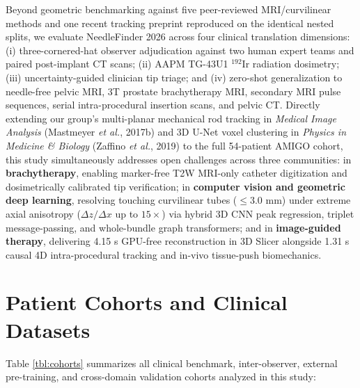 \documentclass[
  11pt,
]{article}
\begin{document}
Beyond geometric benchmarking against five peer-reviewed MRI/curvilinear
methods and one recent tracking preprint reproduced on the identical
nested splits, we evaluate NeedleFinder 2026 across four clinical
translation dimensions: (i) three-cornered-hat observer adjudication
against two human expert teams and paired post-implant CT scans; (ii)
AAPM TG-43U1 \(^{192}\text{Ir}\) radiation dosimetry; (iii)
uncertainty-guided clinician tip triage; and (iv) zero-shot
generalization to needle-free pelvic MRI, 3T prostate brachytherapy MRI,
secondary MRI pulse sequences, serial intra-procedural insertion scans,
and pelvic CT. Directly extending our group's multi-planar mechanical
rod tracking in \emph{Medical Image Analysis} (Mastmeyer \emph{et al.},
2017b) and 3D U-Net voxel clustering in \emph{Physics in Medicine \&
Biology} (Zaffino \emph{et al.}, 2019) to the full 54-patient AMIGO
cohort, this study simultaneously addresses open challenges across three
communities: in \textbf{brachytherapy}, enabling marker-free T2W
MRI-only catheter digitization and dosimetrically calibrated tip
verification; in \textbf{computer vision and geometric deep learning},
resolving touching curvilinear tubes (\(\le 3.0\text{ mm}\)) under
extreme axial anisotropy (\(\Delta z / \Delta x\) up to \(15\times\))
via hybrid 3D CNN peak regression, triplet message-passing, and
whole-bundle graph transformers; and in \textbf{image-guided therapy},
delivering 4.15 s GPU-free reconstruction in 3D Slicer alongside 1.31 s
causal 4D intra-procedural tracking and in-vivo tissue-push
biomechanics.

\FloatBarrier

\section{Patient Cohorts and Clinical
Datasets}\label{patient-cohorts-and-clinical-datasets}



Table \ref{tbl:cohorts} summarizes all clinical benchmark,
inter-observer, external pre-training, and cross-domain validation
cohorts analyzed in this study:
\end{document}

